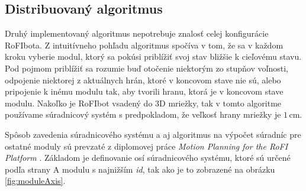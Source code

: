 \documentclass[
  digital, %
  oneside, %
  table,   %
  lof,     %
  nolot,     %
]{fithesis3}
\begin{document}
\subsection{Distribuovaný algoritmus}
\label{sec:distributedAlgo}
Druhý implementovaný algoritmus nepotrebuje znalosť celej konfigurácie RoFIbota. Z intuitívneho pohľadu algoritmus spočíva v tom, že sa v každom kroku vyberie modul, ktorý sa pokúsi priblížiť svoj stav bližšie k cieľovému stavu. Pod pojmom priblížiť sa rozumie buď otočenie niektorým zo stupňov voľnosti, odpojenie niektorej z aktuálnych hrán, ktoré v koncovom stave nie sú, alebo pripojenie k inému modulu tak, aby tvorili hranu, ktorá je v koncovom stave modulu. Nakoľko je RoFIbot vsadený do 3D mriežky, tak v tomto algoritme používame súradnicový systém s predpokladom, že veľkosť hrany mriežky je $1$\,cm. 

Spôsob zavedenia súradnicového systému a aj algoritmus na výpočet súradníc pre ostatné moduly sú prevzaté z diplomovej práce \textit{Motion Planning for the RoFI Platform} \cite{vozarovaMasterThesis}. Základom je definovanie osí súradnicového systému, ktoré sú určené podľa strany A modulu s najnižším \textit{id}, tak ako je to zobrazené na obrázku \ref{fig:moduleAxis}. 
\end{document}
